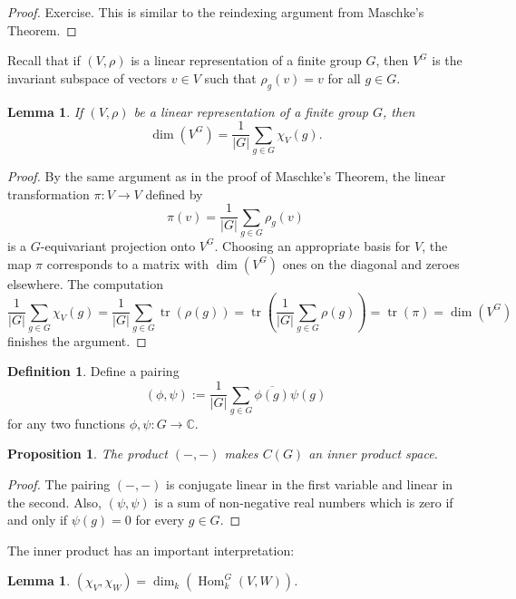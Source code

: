 \documentclass[12pt]{article}
\theoremstyle{plain}
\newtheorem{lemma}[theorem]{Lemma}
\newtheorem{proposition}[theorem]{Proposition}
\theoremstyle{definition}
\newtheorem{definition}[theorem]{Definition}
\theoremstyle{remark}
\numberwithin{equation}{section}
\begin{document}
\begin{proof}
Exercise.  This is similar to the reindexing argument from Maschke's Theorem.
\end{proof}

Recall that if $(V,\rho)$ is a linear representation of a finite group $G$,
then $V^G$ is the invariant subspace of vectors
$v \in V$ such that $\rho_g(v)=v$ for all $g \in G$.

\begin{lemma} \label{lem:proj_onto_invariants}
If $(V,\rho)$ be a linear representation of a finite group $G$,
then
\[ \dim(V^G) = \frac{1}{|G|} \sum_{g \in G} \chi_V(g). \]
\end{lemma}

\begin{proof}
By the same argument as in the proof of Maschke's Theorem,
the linear transformation $\pi : V \to V$ defined by
\[
\pi(v) = \frac{1}{|G|} \sum_{g \in G} \rho_g(v)
\]
is a $G$-equivariant projection onto $V^G$.
Choosing an appropriate basis for $V$, the map $\pi$ corresponds to a
matrix with $\dim(V^G)$ ones on the diagonal and zeroes elsewhere.
The computation
\[
\frac{1}{|G|} \sum_{g \in G} \chi_V(g)
= \frac{1}{|G|} \sum_{g \in G} \operatorname{tr}( \rho(g) )
= \operatorname{tr}\left( \frac{1}{|G|} \sum_{g \in G}\rho(g) \right)
= \operatorname{tr}( \pi ) = \dim(V^G)
\]
finishes the argument.
\end{proof}

\begin{definition} \label{def:innerProduct}
Define a pairing
\[
( \phi , \psi ) := \frac{1}{|G|}
\sum_{g \in G} \overline{\phi(g)} \psi(g)
\]
for any two functions $\phi, \psi : G \to \mathbb{C}$.
\end{definition}

\begin{proposition}
The product $(-,-)$ makes $C(G)$ an inner product space.
\end{proposition}

\begin{proof}
The pairing $(-,-)$ is conjugate linear in the first variable and linear in
the second.  Also, $(\psi,\psi)$ is a sum of non-negative real numbers
which is zero if and only if $\psi(g)=0$ for every $g \in G$.
\end{proof}


The inner product has an important interpretation:

\begin{lemma}
$\displaystyle
(\chi_V, \chi_W) = \dim_k\left( \operatorname{Hom}^G_k\left(V,
W\right)\right)$.
\end{lemma}
\end{document}
